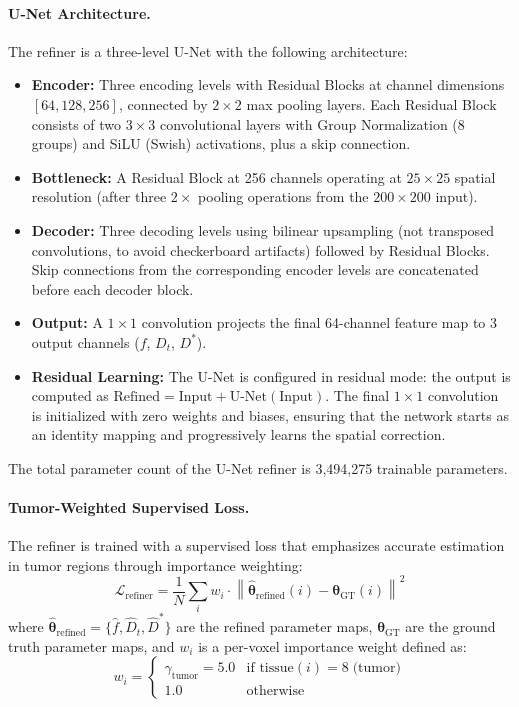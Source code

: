 \documentclass[12pt]{article}
\begin{document}
\paragraph{U-Net Architecture.}
The refiner is a three-level U-Net with the following architecture:
\begin{itemize}
    \item \textbf{Encoder:} Three encoding levels with Residual Blocks at channel dimensions $[64, 128, 256]$, connected by $2{\times}2$ max pooling layers. Each Residual Block consists of two $3{\times}3$ convolutional layers with Group Normalization (8 groups) and SiLU (Swish) activations, plus a skip connection.
    \item \textbf{Bottleneck:} A Residual Block at 256 channels operating at $25{\times}25$ spatial resolution (after three $2\times$ pooling operations from the $200{\times}200$ input).
    \item \textbf{Decoder:} Three decoding levels using bilinear upsampling (not transposed convolutions, to avoid checkerboard artifacts) followed by Residual Blocks. Skip connections from the corresponding encoder levels are concatenated before each decoder block.
    \item \textbf{Output:} A $1{\times}1$ convolution projects the final 64-channel feature map to 3 output channels ($f$, $D_t$, $D^*$).
    \item \textbf{Residual Learning:} The U-Net is configured in residual mode: the output is computed as $\text{Refined} = \text{Input} + \text{U-Net}(\text{Input})$. The final $1{\times}1$ convolution is initialized with zero weights and biases, ensuring that the network starts as an identity mapping and progressively learns the spatial correction.
\end{itemize}

The total parameter count of the U-Net refiner is 3,494,275 trainable parameters.

\paragraph{Tumor-Weighted Supervised Loss.}
The refiner is trained with a supervised loss that emphasizes accurate estimation in tumor regions through importance weighting:
\begin{equation}
\mathcal{L}_{\text{refiner}} = \frac{1}{N} \sum_{i} w_i \cdot \left\|\hat{\boldsymbol{\theta}}_{\text{refined}}(i) - \boldsymbol{\theta}_{\text{GT}}(i)\right\|^2
\label{eq:loss_refiner}
\end{equation}
where $\hat{\boldsymbol{\theta}}_{\text{refined}} = \{\hat{f}, \hat{D}_t, \hat{D}^*\}$ are the refined parameter maps, $\boldsymbol{\theta}_{\text{GT}}$ are the ground truth parameter maps, and $w_i$ is a per-voxel importance weight defined as:
\begin{equation}
w_i =
\begin{cases}
\gamma_{\text{tumor}} = 5.0 & \text{if } \text{tissue}(i) = 8 \;\text{(tumor)} \\
1.0 & \text{otherwise}
\end{cases}
\label{eq:tumor_weight}
\end{equation}
\end{document}
